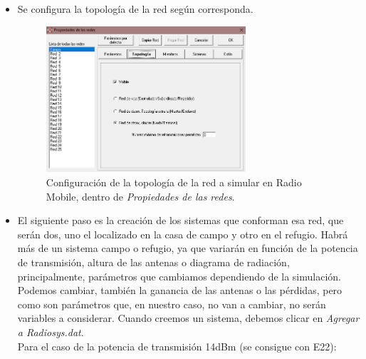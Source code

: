 \documentclass[12pt]{article}
\begin{document}
\begin{itemize}
		\pagebreak
		
		\item Se configura la topología de la red según corresponda.
		
		\pagebreak
		
		\begin{figure}[h]
			\begin{center}
				\includegraphics[width=0.7\textwidth]{img/propRedes_topo_RadioMobile.png}
				\caption{Configuración de la topología de la red a simular en Radio Mobile, dentro de \textit{Propiedades de las redes}.}
				\label{Prop redes topo radiomobile}
			\end{center}
		\end{figure}
		
		\item El siguiente paso es la creación de los sistemas que conforman esa red, que serán dos, uno el localizado en la casa de campo y otro en el refugio. Habrá más de un sistema campo o refugio, ya que variarán en función de la potencia de transmisión, altura de las antenas o diagrama de radiación, principalmente, parámetros que cambiamos dependiendo de la simulación. Podemos cambiar, también la ganancia de las antenas o las pérdidas, pero como son parámetros que, en nuestro caso, no van a cambiar, no serán variables a considerar. Cuando creemos un sistema, debemos clicar en \textit{Agregar a Radiosys.dat}. \\
		
		Para el caso de la potencia de transmisión 14dBm (se consigue con E22): \\
		
		\pagebreak
		

\end{itemize}
\end{document}
